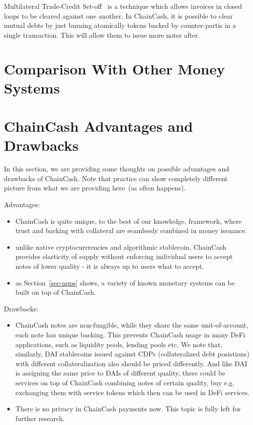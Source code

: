 \documentclass{llncs}   %
\newcommand{\cc}{ChainCash}
\begin{document}
Multilateral Trade-Credit Set-off~\cite{mtcs} is a technique which allows invoices in closed loops to be cleared against one another.
In \cc{}, it is possible to clear mutual debts by just burning atomically tokens backed by counter-partis in a single
transaction. This will allow them to issue more notes after.

\section{Comparison With Other Money Systems}
\label{sec-comparison}

\section{\cc{} Advantages and Drawbacks}

In this section, we are providing some thoughts on possible advantages and drawbacks of \cc{}. Note that practice can show
completely different picture from what we are providing here~(as often happens).

Advantages:
\begin{itemize}
  \item ChainCash is quite unique, to the best of our knowledge, framework, where trust and backing with collateral are
   seamlessly combined in money issuance.
  \item unlike native cryptocurrrencies and algorithmic stablecoin, \cc{} provides elasticity of supply without enforcing
  individual users to accept notes of lower quality - it is always up to users what to accept.
  \item as Section~\ref{sec-apps} shows, a variety of known monetary systems can be built on top of \cc{}.
\end{itemize}

Drawbacks:
\begin{itemize}
  \item ChainCash notes are non-fungible, while they share the same unit-of-account, each note has unique backing. This prevents ChainCash usage
  in many DeFi applications, such as liquidity pools, lending pools etc. We note that, similarly, DAI stablecoins issued against CDPs
  (collateralized debt posistions) with different collateralization also should be priced differently. And like DAI is assigning the same price to
  DAIs of different quality, there could be services on top of \cc{} combining notes of certain quality, buy e.g. exchanging them with service tokens
  which then can be used in DeFi services.
  \item There is no privacy in \cc{} payments now. This topic is fully left for further research.
\end{itemize}


\newpage

 
\end{document}
